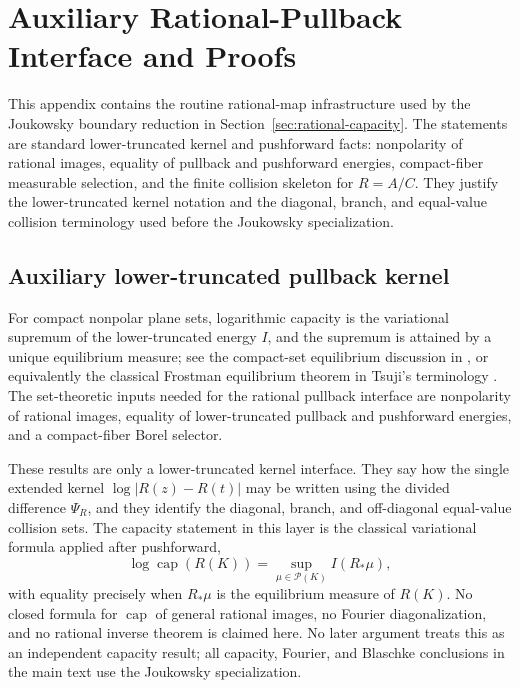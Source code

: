 \section{Auxiliary Rational-Pullback Interface and Proofs}\label{app:auxiliary-rational-pullbacks}

This appendix contains the routine rational-map infrastructure used by the Joukowsky boundary reduction in Section~\ref{sec:rational-capacity}.  The statements are standard lower-truncated kernel and pushforward facts: nonpolarity of rational images, equality of pullback and pushforward energies, compact-fiber measurable selection, and the finite collision skeleton for \(R=A/C\).  They justify the lower-truncated kernel notation and the diagonal, branch, and equal-value collision terminology used before the Joukowsky specialization.

\subsection{Auxiliary lower-truncated pullback kernel}\label{subsec:auxiliary-rational-pullbacks}

For compact nonpolar plane sets, logarithmic capacity is the variational supremum of the lower-truncated energy \(I\), and the supremum is attained by a unique equilibrium measure; see the compact-set equilibrium discussion in \citet[Chap.~5, pp.~105--107]{Ransford1995}, or equivalently the classical Frostman equilibrium theorem in Tsuji's terminology \citep[Chap.~III, Secs.~15--17]{Tsuji1959}.  The set-theoretic inputs needed for the rational pullback interface are nonpolarity of rational images, equality of lower-truncated pullback and pushforward energies, and a compact-fiber Borel selector.

These results are only a lower-truncated kernel interface.  They say how the single extended kernel \(\log|R(z)-R(t)|\) may be written using the divided difference \(\Psi_R\), and they identify the diagonal, branch, and off-diagonal equal-value collision sets.  The capacity statement in this layer is the classical variational formula applied after pushforward,
\[
\log\operatorname{cap}(R(K))=
\sup_{\mu\in\mathcal P(K)} I(R_\ast\mu),
\]
with equality precisely when \(R_\ast\mu\) is the equilibrium measure of \(R(K)\).  No closed formula for \(\operatorname{cap}\) of general rational images, no Fourier diagonalization, and no rational inverse theorem is claimed here.  No later argument treats this as an independent capacity result; all capacity, Fourier, and Blaschke conclusions in the main text use the Joukowsky specialization.

